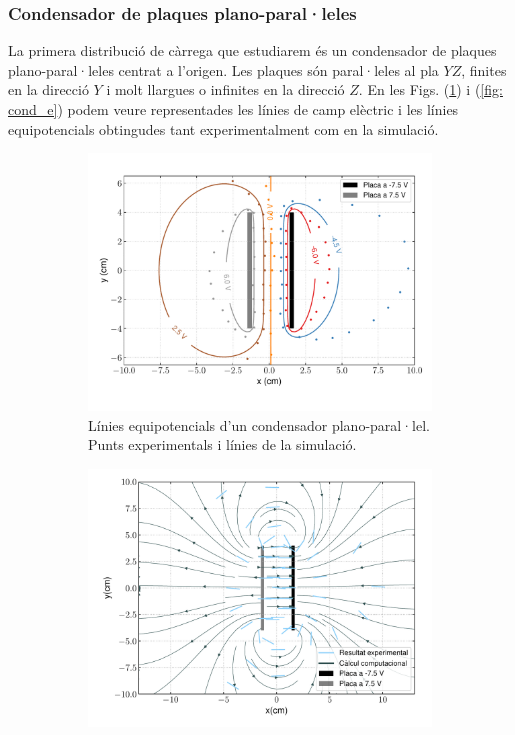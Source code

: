 \documentclass[11pt]{article}
\numberwithin{equation}{section}
\numberwithin{figure}{section}
\numberwithin{table}{section}
\begin{document}
\subsubsection{Condensador de plaques plano-paral·leles}\label{sec: cond}
La primera distribució de càrrega que estudiarem és un condensador de plaques plano-paral·leles centrat a l'origen. Les plaques són paral·leles al pla $YZ$, finites en la direcció $Y$ i molt llargues o infinites en la direcció $Z$.
En les Figs. (\ref{fig: cond_pot}) i (\ref{fig: cond_e}) podem veure representades les línies de camp elèctric i les línies equipotencials obtingudes tant experimentalment com en la simulació.   
\begin{figure}[h]
    \centering
    \begin{subfigure}{0.495\textwidth}
        \centering
        \includegraphics[width=\textwidth]{cond_combi_def.pdf}
        \caption{Línies equipotencials d'un condensador plano-paral·lel. Punts experimentals i línies de la simulació.}
        \label{fig: cond_pot}
    \end{subfigure}
    \begin{subfigure}{0.495\textwidth} 
        \centering
        \includegraphics[width=\textwidth]{cond_camp.pdf}

\end{subfigure}
\end{figure}
\end{document}
